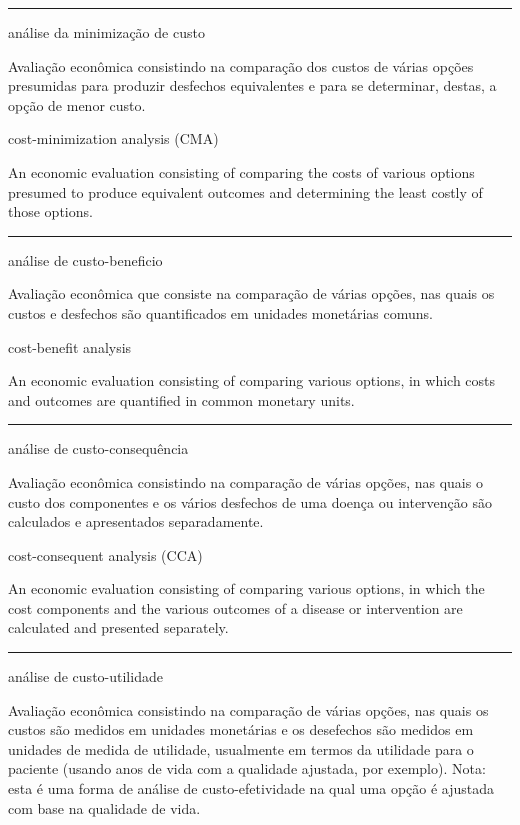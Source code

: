 \documentclass[
]{book}
\begin{document}
\begin{center}\rule{0.5\linewidth}{0.5pt}\end{center}

análise da minimização de custo

Avaliação econômica consistindo na comparação dos custos de várias opções presumidas para produzir desfechos equivalentes e para se determinar, destas, a opção de menor custo.

cost-minimization analysis (CMA)

An economic evaluation consisting of comparing the costs of various options presumed to produce equivalent outcomes and determining the least costly of those options.

\begin{center}\rule{0.5\linewidth}{0.5pt}\end{center}

análise de custo-beneficio

Avaliação econômica que consiste na comparação de várias opções, nas quais os custos e desfechos são quantificados em unidades monetárias comuns.

cost-benefit analysis

An economic evaluation consisting of comparing various options, in which costs and outcomes are quantified in common monetary units.

\begin{center}\rule{0.5\linewidth}{0.5pt}\end{center}

análise de custo-consequência

Avaliação econômica consistindo na comparação de várias opções, nas quais o custo dos componentes e os vários desfechos de uma doença ou intervenção são calculados e apresentados separadamente.

cost-consequent analysis (CCA)

An economic evaluation consisting of comparing various options, in which the cost components and the various outcomes of a disease or intervention are calculated and presented separately.

\begin{center}\rule{0.5\linewidth}{0.5pt}\end{center}

análise de custo-utilidade

Avaliação econômica consistindo na comparação de várias opções, nas quais os custos são medidos em unidades monetárias e os desefechos são medidos em unidades de medida de utilidade, usualmente em termos da utilidade para o paciente (usando anos de vida com a qualidade ajustada, por exemplo). Nota: esta é uma forma de análise de custo-efetividade na qual uma opção é ajustada com base na qualidade de vida.
\end{document}
